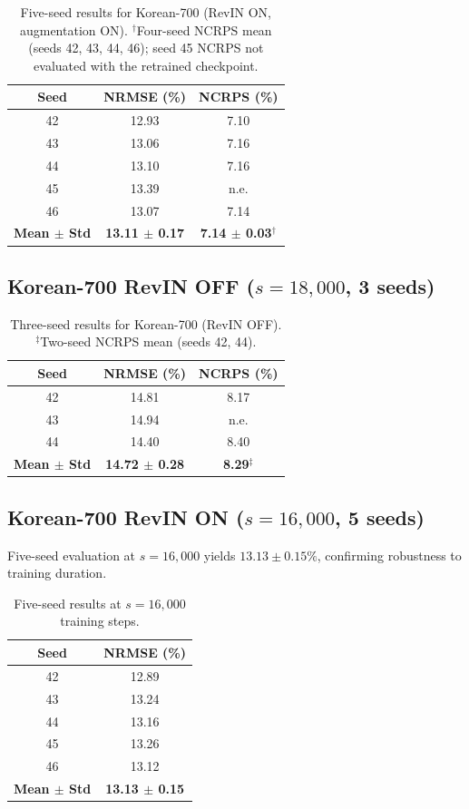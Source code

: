 \documentclass[preprint,12pt,authoryear]{elsarticle}
\begin{document}
\begin{table}[H]
\centering
\begin{tabular}{ccc}
\toprule
Seed & NRMSE (\%) & NCRPS (\%) \\
\midrule
42 & 12.93 & 7.10 \\
43 & 13.06 & 7.16 \\
44 & 13.10 & 7.16 \\
45 & 13.39 & n.e. \\
46 & 13.07 & 7.14 \\
\textbf{Mean $\pm$ Std} & \textbf{13.11 $\pm$ 0.17} & \textbf{7.14 $\pm$ 0.03}$^\dagger$ \\
\bottomrule
\end{tabular}
\caption{Five-seed results for Korean-700 (RevIN ON, augmentation ON). $^\dagger$Four-seed NCRPS mean (seeds 42, 43, 44, 46); seed 45 NCRPS not evaluated with the retrained checkpoint.}
\label{tab:seeds_on}
\end{table}

\subsection{Korean-700 RevIN OFF ($s = 18{,}000$, 3 seeds)}

\begin{table}[H]
\centering
\begin{tabular}{ccc}
\toprule
Seed & NRMSE (\%) & NCRPS (\%) \\
\midrule
42 & 14.81 & 8.17 \\
43 & 14.94 & n.e. \\
44 & 14.40 & 8.40 \\
\textbf{Mean $\pm$ Std} & \textbf{14.72 $\pm$ 0.28} & \textbf{8.29}$^\ddagger$ \\
\bottomrule
\end{tabular}
\caption{Three-seed results for Korean-700 (RevIN OFF). $^\ddagger$Two-seed NCRPS mean (seeds 42, 44).}
\label{tab:seeds_off}
\end{table}

\subsection{Korean-700 RevIN ON ($s = 16{,}000$, 5 seeds)}

Five-seed evaluation at $s = 16{,}000$ yields $13.13 \pm 0.15\%$, confirming robustness to training duration.

\begin{table}[H]
\centering
\begin{tabular}{cc}
\toprule
Seed & NRMSE (\%) \\
\midrule
42 & 12.89 \\
43 & 13.24 \\
44 & 13.16 \\
45 & 13.26 \\
46 & 13.12 \\
\textbf{Mean $\pm$ Std} & \textbf{13.13 $\pm$ 0.15} \\
\bottomrule
\end{tabular}
\caption{Five-seed results at $s = 16{,}000$ training steps.}
\label{tab:seeds_16k}
\end{table}
\end{document}
